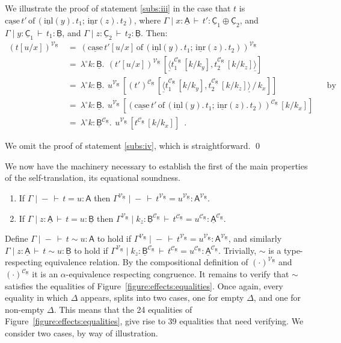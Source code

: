 \documentclass{LMCS}
\newcommand{\comptype}[1]{\underline{#1}}
\newcommand{\VA}{\mathsf{A}}
\newcommand{\CA}{\comptype{\mathsf{A}}}
\newcommand{\CB}{\comptype{\mathsf{B}}}
\newcommand{\CC}{\comptype{\mathsf{C}}}
\newcommand{\CR}{\comptype{\mathsf{R}}}
\newcommand{\In}[2]{#1 \colon  \! #2}
\newcommand{\rIn}[2]{#1 \colon  #2}
\newcommand{\Cj}[4]{#1 \mid  \! #2 \, \vdash \, \rIn{#3}{#4}}
\newcommand{\Ceq}[5]{#1 \mid  \! #2 \, \vdash \, #3 = #4 \colon #5}
\newcommand{\Veq}[4]{\Ceq{#1}{-}{#2}{#3}{#4}}
\newcommand{\Csim}[5]{#1 \mid  \! #2 \, \vdash \, #3 \sim #4 \colon #5}
\newcommand{\Vsim}[4]{\Csim{#1}{-}{#2}{#3}{#4}}
\newcommand{\compop}[1]{\underline{#1}}
\newcommand{\Cpair}[2]{\compop{\langle} #1 , #2 \compop{\rangle}}
\newcommand{\llambda}{\lambda^{\!\circ\!}}
\newcommand{\llam}[3]{\llambda \In{#1}{#2}.\: #3}
\newcommand{\lappl}[2]{#1[#2]}
\newcommand{\Cinl}[1]{\compop{\mathrm{inl}}(#1)}
\newcommand{\Cinr}[1]{\compop{\mathrm{inr}}(#1)}
\newcommand{\Ccase}[5]{\compop{\mathrm{case}} \, #1 \,\mathrm{of}\,( \Cinl{#2}. \, #3 ; \, \Cinr{#4}. \, #5)}
\newcommand{\CpsVT}[1]{#1^{\mathcal{V}_{\CR}}}
\newcommand{\CpsCT}[1]{#1^{\mathcal{C}_{\CR}}}
\begin{document}
We illustrate the proof of statement \ref{subs:iii} in the case that $t$ is
$\Ccase{t'}{y}{t_1}{z}{t_2}$, where
$\Cj{\Gamma}{\In{x}{\CA}}{t'}{\CC_1 \oplus \CC_2}$, and
$\Cj{\Gamma}{\In{y}{\CC_1}}{t_1}{\CB}$, and
$\Cj{\Gamma}{\In{z}{\CC_2}}{t_2}{\CB}$. Then:
\begin{align*}
\CpsVT{(t[u/x])} \: 
& = \: \CpsVT{(\Ccase{t'[u/x]}{y}{t_1}{z}{t_2})}
\\
& = \:   \llam{k}{\CB}{\, 
   \lappl{\CpsVT{(t'[u/x])}\,}{\Cpair{\CpsCT{t_1}\, [k/k_y]}{\CpsCT{t_2}\, [k/k_z]}}}
\\
& = \:  \llam{k}{\CB}{\, 
      \lappl{\CpsVT{u}\,}{\CpsCT{(t')}\,[\Cpair{\CpsCT{t_1}\, [k/k_y]}{\CpsCT{t_2}\, [k/k_z]}\,/\,k_x]}}
  && \text{by induction hypothesis}
\\
& = \: \llam{k}{\CB}{\, 
          \lappl{\CpsVT{u}\,}{\CpsCT{(\Ccase{t'}{y}{t_1}{z}{t_2})}\, [k/k_x]}}
\\
& =  \: \llam{k}{\CpsCT{\CB}}{\,\lappl{\CpsVT{u}\,}{\CpsCT{t}\,[k/k_x]}}
\enspace .
\end{align*}

We omit the proof of statement \ref{subs:iv}, which is straightforward.
\qed


We now have the machinery necessary to establish the first of the main properties
of the self-translation, its equational soundness.

\begin{thm}[Soundness]
\label{thm:cps:soundness}
\leavevmode
\begin{enumerate}[\em(1)]
\item If $\Veq{\Gamma}{t}{u}{\VA}$ then 
$\Veq{\CpsVT{\Gamma}}{\CpsVT{t}}{\CpsVT{u}}{\CpsVT{\VA}}$.

\item If $\Ceq{\Gamma}{\In{z}{\CA}}{t}{u}{\CB}$
then $\Ceq{\CpsVT{\Gamma}}{\In{k_z}{\CpsCT{\CB}}}{\CpsCT{t}}{\CpsCT{u}}{\CpsCT{\CA}}$.
\end{enumerate}
\end{thm}

\proof
Define $\Vsim{\Gamma}{t}{u}{\VA}$  to hold if 
$\Veq{\CpsVT{\Gamma}}{\CpsVT{t}}{\CpsVT{u}}{\CpsVT{\VA}}$,
and similarly $\Csim{\Gamma}{\In{z}{\CA}}{t}{u}{\CB}$ to hold if 
$\Ceq{\CpsVT{\Gamma}}{\In{k_z}{\CpsCT{\CB}}}{\CpsCT{t}}{\CpsCT{u}}{\CpsCT{\CA}}$.
Trivially, $\sim$ is a type-respecting equivalence relation.
By the compositional definition of $\CpsVT{(\cdot)}$ and $\CpsCT{(\cdot)}$
it is an $\alpha$-equivalence respecting congruence. It remains to
verify that $\sim$ satisfies the equalities of 
Figure~\ref{figure:effects:equalities}. Once again, every equality in
which $\Delta$ appears, splits into two cases, one for empty $\Delta$, and one for non-empty
$\Delta$. This means that  the 24 equalities of Figure~\ref{figure:effects:equalities},
give rise to 39 equalities that need verifying. We consider two cases, by way of illustration.
\end{document}
